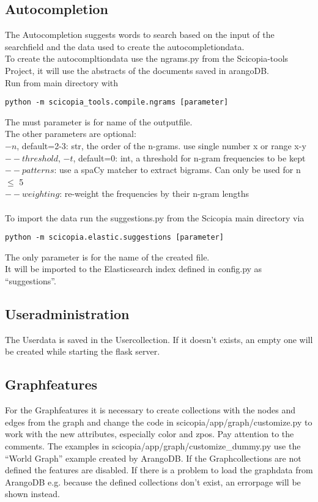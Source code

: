 \subsection{Autocompletion}
The Autocompletion suggests words to search based on the input of the searchfield and the data used to create the autocompletiondata.\\
To create the autocompltiondata use the ngrams.py from the Scicopia-tools Project, it will use the abstracts of the documents saved in arangoDB.\\
Run from main directory with
\begin{verbatim}
python -m scicopia_tools.compile.ngrams [parameter]
\end{verbatim}
The must parameter is for name of the outputfile.\\
The other parameters are optional:\\
$-n$, default=2-3: str, the order of the n-grams. use single number x or range x-y\\
$--threshold$, $-t$, default=0: int, a threshold for n-gram frequencies to be kept\\
$--patterns$: use a spaCy matcher to extract bigrams. Can only be used for n $\leq$ 5\\
$--weighting$: re-weight the frequencies by their n-gram lengths\\
\\
To import the data run the suggestions.py from the Scicopia main directory via
\begin{verbatim}
python -m scicopia.elastic.suggestions [parameter]
\end{verbatim}
The only parameter is for the name of the created file.\\
It will be imported to the Elasticsearch index defined in config.py as ``suggestions''.

\subsection{Useradministration}
The Userdata is saved in the Usercollection. If it doesn't exists, an empty one will be created while starting the flask server.

\subsection{Graphfeatures}
For the Graphfeatures it is necessary to create collections with the nodes and edges from the graph and change the code in scicopia/app/graph/customize.py to work with the new attributes, especially color and zpos. Pay attention to the comments. The examples in scicopia/app/graph/customize\_dummy.py use the ``World Graph'' example created by ArangoDB. If the Graphcollections are not defined the features are disabled. If there is a problem to load the graphdata from ArangoDB e.g. because the defined collections don't exist, an errorpage will be shown instead.

